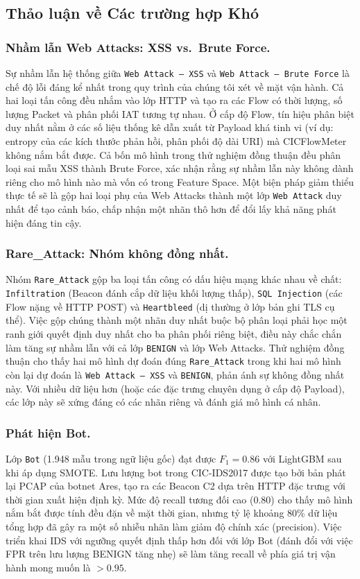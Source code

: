 \subsection{Thảo luận về Các trường hợp Khó}
\label{sec:exp-scenarios}

\subsubsection*{Nhầm lẫn Web Attacks: XSS vs.\ Brute Force.}
Sự nhầm lẫn hệ thống giữa \texttt{Web Attack -- XSS} và \texttt{Web Attack -- Brute Force} là chế độ lỗi đáng kể nhất trong quy trình của chúng tôi xét về mặt vận hành. Cả hai loại tấn công đều nhắm vào lớp HTTP và tạo ra các Flow có thời lượng, số lượng Packet và phân phối IAT tương tự nhau. Ở cấp độ Flow, tín hiệu phân biệt duy nhất nằm ở các số liệu thống kê dẫn xuất từ Payload khá tinh vi (ví dụ: entropy của các kích thước phản hồi, phân phối độ dài URI) mà CICFlowMeter không nắm bắt được. Cả bốn mô hình trong thử nghiệm đồng thuận đều phân loại sai mẫu XSS thành Brute Force, xác nhận rằng sự nhầm lẫn này không dành riêng cho mô hình nào mà vốn có trong Feature Space. Một biện pháp giảm thiểu thực tế sẽ là gộp hai loại phụ của Web Attacks thành một lớp \texttt{Web Attack} duy nhất để tạo cảnh báo, chấp nhận một nhãn thô hơn để đổi lấy khả năng phát hiện đáng tin cậy.

\subsubsection*{Rare\_Attack: Nhóm không đồng nhất.}
Nhóm \texttt{Rare\_Attack} gộp ba loại tấn công có dấu hiệu mạng khác nhau về chất: \texttt{Infiltration} (Beacon đánh cắp dữ liệu khối lượng thấp), \texttt{SQL Injection} (các Flow nặng về HTTP POST) và \texttt{Heartbleed} (dị thường ở lớp bản ghi TLS cụ thể). Việc gộp chúng thành một nhãn duy nhất buộc bộ phân loại phải học một ranh giới quyết định duy nhất cho ba phân phối riêng biệt, điều này chắc chắn làm tăng sự nhầm lẫn với cả lớp \texttt{BENIGN} và lớp Web Attacks. Thử nghiệm đồng thuận cho thấy hai mô hình dự đoán đúng \texttt{Rare\_Attack} trong khi hai mô hình còn lại dự đoán là \texttt{Web Attack -- XSS} và \texttt{BENIGN}, phản ánh sự không đồng nhất này. Với nhiều dữ liệu hơn (hoặc các đặc trưng chuyên dụng ở cấp độ Payload), các lớp này sẽ xứng đáng có các nhãn riêng và đánh giá mô hình cá nhân.

\subsubsection*{Phát hiện Bot.}
Lớp \texttt{Bot} (1.948 mẫu trong ngữ liệu gốc) đạt được $F_1 = 0.86$ với LightGBM sau khi áp dụng SMOTE. Lưu lượng bot trong CIC-IDS2017 được tạo bởi bản phát lại PCAP của botnet Ares, tạo ra các Beacon C2 dựa trên HTTP đặc trưng với thời gian xuất hiện định kỳ. Mức độ recall tương đối cao (0.80) cho thấy mô hình nắm bắt được tính đều đặn về mặt thời gian, nhưng tỷ lệ khoảng 80\% dữ liệu tổng hợp đã gây ra một số nhiễu nhãn làm giảm độ chính xác (precision). Việc triển khai IDS với ngưỡng quyết định thấp hơn đối với lớp Bot (đánh đổi với việc FPR trên lưu lượng BENIGN tăng nhẹ) sẽ làm tăng recall về phía giá trị vận hành mong muốn là $> 0.95$.
